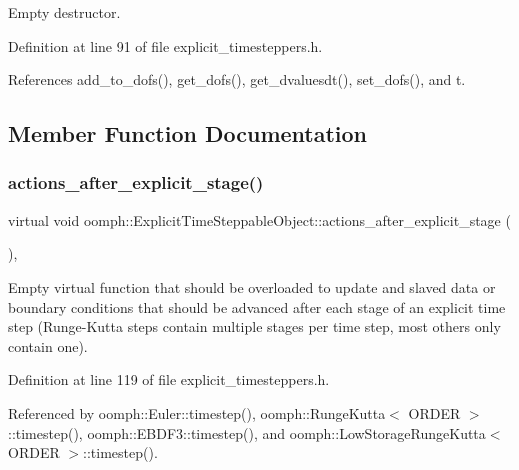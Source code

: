Empty destructor. 



Definition at line 91 of file explicit\+\_\+timesteppers.\+h.



References add\+\_\+to\+\_\+dofs(), get\+\_\+dofs(), get\+\_\+dvaluesdt(), set\+\_\+dofs(), and t.



\subsection{Member Function Documentation}
\mbox{\label{classoomph_1_1ExplicitTimeSteppableObject_ad1eb700abad36e868a84c475f9866b7d}} 
\subsubsection{\texorpdfstring{actions\+\_\+after\+\_\+explicit\+\_\+stage()}{actions\_after\_explicit\_stage()}}
{\footnotesize\ttfamily virtual void oomph\+::\+Explicit\+Time\+Steppable\+Object\+::actions\+\_\+after\+\_\+explicit\+\_\+stage (\begin{DoxyParamCaption}{ }\end{DoxyParamCaption})\hspace{0.3cm}{\ttfamily [inline]}, {\ttfamily [virtual]}}



Empty virtual function that should be overloaded to update and slaved data or boundary conditions that should be advanced after each stage of an explicit time step (Runge-\/\+Kutta steps contain multiple stages per time step, most others only contain one). 



Definition at line 119 of file explicit\+\_\+timesteppers.\+h.



Referenced by oomph\+::\+Euler\+::timestep(), oomph\+::\+Runge\+Kutta$<$ O\+R\+D\+E\+R $>$\+::timestep(), oomph\+::\+E\+B\+D\+F3\+::timestep(), and oomph\+::\+Low\+Storage\+Runge\+Kutta$<$ O\+R\+D\+E\+R $>$\+::timestep().

